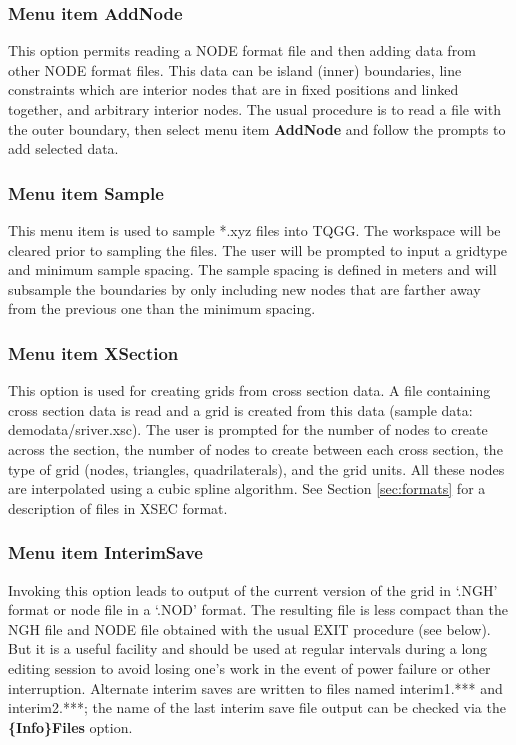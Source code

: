 \documentclass{article}
\begin{document}
\subsubsection[Menu item AddNode]{Menu item AddNode}
This option permits reading a NODE format file and then adding data from other NODE format files. This data can be island (inner) boundaries, line constraints which are interior nodes that are in fixed positions and linked together, and arbitrary interior nodes. The usual procedure is to read a file with the outer boundary, then select menu item {\bf AddNode} and follow the prompts to add selected data. 

\subsubsection[Menu item Sample]{Menu item Sample}
This menu item is used to sample *.xyz files into TQGG. The workspace will be cleared prior to sampling the files.
The user will be prompted to input a gridtype and minimum sample spacing. The sample spacing is defined in meters and will subsample the boundaries by only including new nodes that are farther away from the previous one than the minimum spacing.

\subsubsection[Menu item CrossSection]{Menu item XSection}
This option is used for creating grids from cross section data. A file containing cross section data is read and a grid is created from this data (sample data: demodata/sriver.xsc). The user is prompted for the number of nodes to create across the section, the number of nodes to create between each cross section, the type of grid (nodes, triangles, quadrilaterals), and the grid units. All these nodes are interpolated using a cubic spline algorithm. See Section \ref{sec:formats} for a description of files in XSEC format.

\subsubsection[Menu item InterimSave]{Menu item InterimSave}
Invoking this option leads to output of the current version of the grid in `.NGH' format or node file in a `.NOD' format. The resulting file is less compact than the NGH file and NODE file obtained with the usual EXIT procedure (see below). But it is a useful facility and should be used at regular intervals during a long editing session to avoid losing one's work in the event of power failure or other interruption. Alternate interim saves are written to files named interim1.*** and interim2.***; the name of the last interim save file output can be checked via the \textbf{\{Info\}Files} option.
\end{document}
